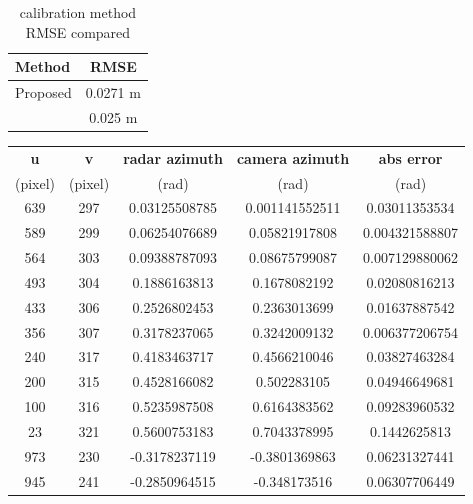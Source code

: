 \begin{table}[h!]
    \begin{center}
      \label{tab:table4}
      \begin{tabular}{l|c} %
        \textbf{Method} & \textbf{RMSE} \\%
        \hline
        Proposed                            & 0.0271 m \\%
        \citeauthor{8794186}\cite{8794186}  & 0.025 m \\%
      \end{tabular}
    \end{center}
    \caption{calibration method RMSE compared}
    \label{tab:callib_rmse}
  \end{table}
  \begin{table}[htbp]
    \centering
    \begin{tabular}{|c|c|c|c|c|}
    \hline
    \textbf{u} & \textbf{v }  & \textbf{radar azimuth} & \textbf{camera azimuth} & \textbf{abs error} \\ 
    (pixel)   &(pixel)          &(rad)                  &(rad)&(rad)\\%
    \hline
        639 & 297 & 0.03125508785 & 0.001141552511 & 0.03011353534 \\
        589 & 299 & 0.06254076689 & 0.05821917808 & 0.004321588807 \\
        564 & 303 & 0.09388787093 & 0.08675799087 & 0.007129880062 \\
        493 & 304 & 0.1886163813 & 0.1678082192 & 0.02080816213 \\
        433 & 306 & 0.2526802453 & 0.2363013699 & 0.01637887542 \\
        356 & 307 & 0.3178237065 & 0.3242009132 & 0.006377206754 \\
        240 & 317 & 0.4183463717 & 0.4566210046 & 0.03827463284 \\
        200 & 315 & 0.4528166082 & 0.502283105 & 0.04946649681 \\
        100 & 316 & 0.5235987508 & 0.6164383562 & 0.09283960532 \\
        23 & 321 & 0.5600753183 & 0.7043378995 & 0.1442625813 \\
        973 & 230 & -0.3178237119 & -0.3801369863 & 0.06231327441 \\
        945 & 241 & -0.2850964515 & -0.348173516 & 0.06307706449 \\

\end{tabular}
\end{table}
